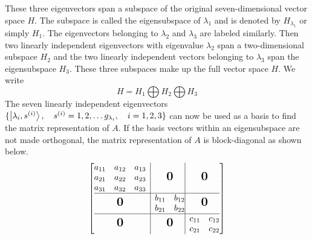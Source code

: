 	These three eigenvectors span a subspace of the original seven-dimensional vector space $H$. The subspace is called the eigensubspace of $\lambda_1$ and is denoted by $H_{\lambda_1}$ or simply $H_1$. The eigenvectors belonging to $\lambda_2$ and $\lambda_3$ are labeled similarly. Then two linearly independent eigenvectors with eigenvalue $\lambda_2$ span a two-dimensional subspace $H_2$ and the two linearly independent vectors belonging to $\lambda_3$ span the eigensubspace $H_3$. These three subspaces make up the full vector space $H$. We write
	\begin{equation}
		H = H_1 \bigoplus H_2 \bigoplus H_3
	\end{equation}
	The seven linearly independent eigenvectors $\{\ket{\lambda_i, s^{(i)}}, \quad s^{(i)}=1,2,\ldots g_{\lambda_i}, \quad i=1,2,3 \}$
	can now be used as a basis to find the matrix representation of $A$. If the basis vectors within an eigensubspace are not made orthogonal, the matrix representation of $A$ is block-diagonal as shown below.
	\begin{equation}
		\left[\begin{array}{@{}c|c@{}|c@{}}
		\begin{matrix}
		a_{11} & a_{12} & a_{13} \\
		a_{21} & a_{22} & a_{23} \\
		a_{31} & a_{32} & a_{33}
		\end{matrix}
		& \bigzero & \bigzero\\
		\hline
		\bigzero &
		\begin{matrix}
		b_{11} & b_{12} \\
		b_{21} & b_{22}
		\end{matrix}
		& \bigzero \\
		\hline
		\bigzero & \bigzero &
		\begin{matrix}
		c_{11} & c_{12} \\
		c_{21} & c_{22}
		\end{matrix}
		\end{array}\right]
	\end{equation}
	
%	
%
	
